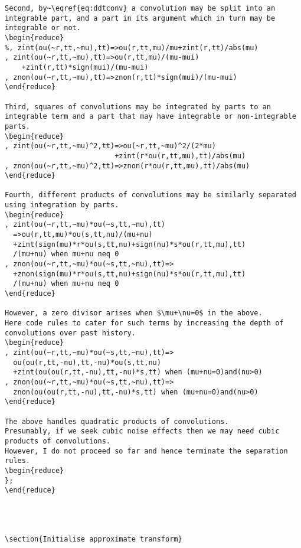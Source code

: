 \documentclass[11pt,a5paper]{article}
\begin{document}
\begin{reduce}
\begin{verbatim}
Second, by~\eqref{eq:ddtconv} a convolution may be split into an integrable part, and a part in its argument which in turn may be integrable or not.
\begin{reduce}
%, zint(ou(~r,tt,~mu),tt)=>ou(r,tt,mu)/mu+zint(r,tt)/abs(mu)
, zint(ou(~r,tt,~mu),tt)=>ou(r,tt,mu)/(mu-mui)
    +zint(r,tt)*sign(mui)/(mu-mui)
, znon(ou(~r,tt,~mu),tt)=>znon(r,tt)*sign(mui)/(mu-mui)
\end{reduce}

Third, squares of convolutions may be integrated by parts to an integrable term and a part that may have integrable or non-integrable parts.
\begin{reduce}
, zint(ou(~r,tt,~mu)^2,tt)=>ou(~r,tt,~mu)^2/(2*mu)
                          +zint(r*ou(r,tt,mu),tt)/abs(mu)
, znon(ou(~r,tt,~mu)^2,tt)=>znon(r*ou(r,tt,mu),tt)/abs(mu)
\end{reduce}

Fourth, different products of convolutions may be similarly separated using integration by parts.  
\begin{reduce}
, zint(ou(~r,tt,~mu)*ou(~s,tt,~nu),tt)
  =>ou(r,tt,mu)*ou(s,tt,nu)/(mu+nu)
  +zint(sign(mu)*r*ou(s,tt,nu)+sign(nu)*s*ou(r,tt,mu),tt)
  /(mu+nu) when mu+nu neq 0
, znon(ou(~r,tt,~mu)*ou(~s,tt,~nu),tt)=>
  +znon(sign(mu)*r*ou(s,tt,nu)+sign(nu)*s*ou(r,tt,mu),tt)
  /(mu+nu) when mu+nu neq 0
\end{reduce}

However, a zero divisor arises when $\mu+\nu=0$ in the above.
Here code rules to cater for such terms by increasing the depth of convolutions over past history.
\begin{reduce}
, zint(ou(~r,tt,~mu)*ou(~s,tt,~nu),tt)=>
  ou(ou(r,tt,-nu),tt,-nu)*ou(s,tt,nu)
  +zint(ou(ou(r,tt,-nu),tt,-nu)*s,tt) when (mu+nu=0)and(nu>0)
, znon(ou(~r,tt,~mu)*ou(~s,tt,~nu),tt)=>
  znon(ou(ou(r,tt,-nu),tt,-nu)*s,tt) when (mu+nu=0)and(nu>0)
\end{reduce}

The above handles quadratic products of convolutions.
Presumably, if we seek cubic noise effects then we may need cubic products of convolutions.
However, I do not proceed so far and hence terminate the separation rules.
\begin{reduce}
};
\end{reduce}




\section{Initialise approximate transform}


\end{verbatim}
\end{reduce}
\end{document}
